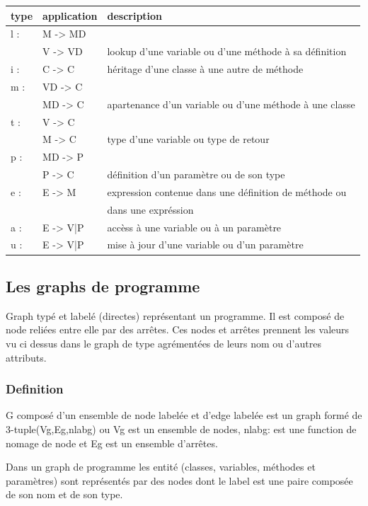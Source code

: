 \documentclass[a4paper, 12pt]{article}
\begin{document}
  \begin{tabular}{ | l | l |  l |}
    \hline type & application & description  \\ \hline
    l : & M -> MD & \\ & V -> VD & lookup d'une variable ou d'une méthode à sa définition  \\ \hline 
    i : & C -> C &  héritage d'une classe à une autre de méthode    \\ \hline
    m : & VD -> C & \\ & MD -> C & apartenance d'un variable ou d'une méthode à une classe    \\ \hline
    t : & V -> C  & \\ &  M -> C & type d'une variable ou type de retour    \\ \hline
    p : & MD -> P  & \\ &  P -> C & définition d'un paramètre ou de son type     \\ \hline
    e : & E -> M & expression contenue dans une définition de méthode ou \\ & &  dans une expréssion    \\ \hline
    a : & E -> {V|P} & accèss à une variable ou à un paramètre    \\ \hline
    u : & E -> {V|P} & mise à jour d'une variable ou d'un paramètre    \\ \hline
   \end{tabular}


\subsection{Les graphs de programme} 

Graph typé et labelé (directes) représentant un programme. Il est composé de node reliées entre elle par des arrêtes. Ces nodes et arrêtes prennent les valeurs vu ci dessus dans le graph de type agrémentées de leurs nom ou d'autres attributs.

\subsubsection{Definition}
G composé d'un ensemble de node labelée et d'edge labelée est un graph formé de 3-tuple(Vg,Eg,nlabg) ou Vg est un ensemble de nodes, nlabg: est une function de nomage de node et Eg est un ensemble
d'arrêtes.

Dans un graph de programme les entité (classes, variables, méthodes et paramètres) sont représentés par des nodes dont le label est une paire composée de son nom et de son type.
\end{document}
